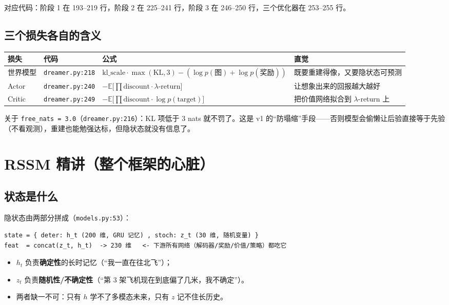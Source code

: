 \documentclass[11pt]{ctexart}
\begin{document}
对应代码：阶段 1 在 193--219 行，阶段 2 在 225--241 行，阶段 3 在 246--250 行，三个优化器在 253--255 行。

\subsection{三个损失各自的含义}
\begin{tabularx}{\textwidth}{l l l L}
\toprule
\textbf{损失} & \textbf{代码} & \textbf{公式} & \textbf{直觉} \\
\midrule
世界模型 & \texttt{dreamer.py:218} & $\mathrm{kl\_scale}\cdot\max(\mathrm{KL},3)-(\log p(\text{图})+\log p(\text{奖励}))$ & 既要重建得像，又要隐状态可预测 \\
\addlinespace
Actor & \texttt{dreamer.py:240} & $-\mathbb{E}\big[\prod \text{discount}\cdot\lambda\text{-return}\big]$ & 让想象出来的回报越大越好 \\
\addlinespace
Critic & \texttt{dreamer.py:249} & $-\mathbb{E}\big[\prod \text{discount}\cdot\log p(\text{target})\big]$ & 把价值网络拟合到 $\lambda$-return 上 \\
\bottomrule
\end{tabularx}

关于 \texttt{free\_nats = 3.0}（\texttt{dreamer.py:216}）：KL 项低于 3 nats 就不罚了。这是 v1 的``防塌缩''手段——否则模型会偷懒让后验直接等于先验（不看观测），重建也能勉强达标，但隐状态就没有信息了。

\section{RSSM 精讲（整个框架的心脏）}

\subsection{状态是什么}
隐状态由两部分拼成（\texttt{models.py:53}）：
\begin{Verbatim}[frame=single,fontsize=\small]
state = { deter: h_t (200 维, GRU 记忆) , stoch: z_t (30 维, 随机变量) }
feat  = concat(z_t, h_t)  -> 230 维   <- 下游所有网络（解码器/奖励/价值/策略）都吃它
\end{Verbatim}
\begin{itemize}
  \item $h_t$ 负责\textbf{确定性}的长时记忆（``我一直在往北飞''）；
  \item $z_t$ 负责\textbf{随机性/不确定性}（``第 3 架飞机现在到底偏了几米，我不确定''）。
  \item 两者缺一不可：只有 $h$ 学不了多模态未来，只有 $z$ 记不住长历史。
\end{itemize}
\end{document}

